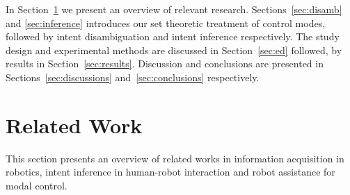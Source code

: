 \documentclass[letterpaper, 10 pt, conference]{ieeeconf}  %
\begin{document}

In Section~\ref{sec:related_work} we present an overview of relevant research. Sections~\ref{sec:disamb} and \ref{sec:inference} introduces our set theoretic treatment of control modes, followed by intent disambiguation and intent inference respectively. The study design and experimental methods are discussed in Section~\ref{sec:ed} followed, by results in Section~\ref{sec:results}. Discussion and conclusions are presented in Sections~\ref{sec:discussions} and~\ref{sec:conclusions} respectively.  


\section{Related Work}\label{sec:related_work}
This section presents an overview of related works in information acquisition in robotics, intent inference in human-robot interaction and robot assistance for modal control. 
%
\end{document}
